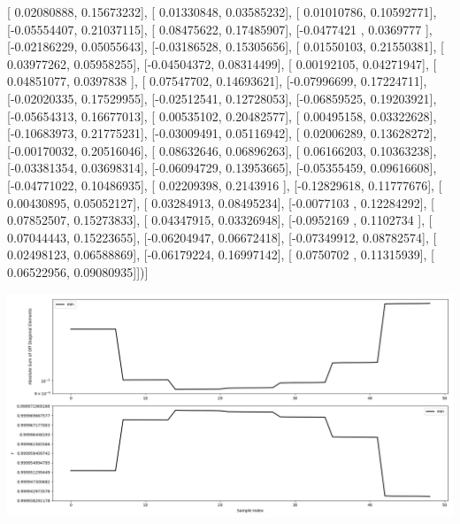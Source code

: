 \documentclass{article}
\begin{document}
       [ 0.02080888,  0.15673232],
       [ 0.01330848,  0.03585232],
       [ 0.01010786,  0.10592771],
       [-0.05554407,  0.21037115],
       [ 0.08475622,  0.17485907],
       [-0.0477421 ,  0.0369777 ],
       [-0.02186229,  0.05055643],
       [-0.03186528,  0.15305656],
       [ 0.01550103,  0.21550381],
       [ 0.03977262,  0.05958255],
       [-0.04504372,  0.08314499],
       [ 0.00192105,  0.04271947],
       [ 0.04851077,  0.0397838 ],
       [ 0.07547702,  0.14693621],
       [-0.07996699,  0.17224711],
       [-0.02020335,  0.17529955],
       [-0.02512541,  0.12728053],
       [-0.06859525,  0.19203921],
       [-0.05654313,  0.16677013],
       [ 0.00535102,  0.20482577],
       [ 0.00495158,  0.03322628],
       [-0.10683973,  0.21775231],
       [-0.03009491,  0.05116942],
       [ 0.02006289,  0.13628272],
       [-0.00170032,  0.20516046],
       [ 0.08632646,  0.06896263],
       [ 0.06166203,  0.10363238],
       [-0.03381354,  0.03698314],
       [-0.06094729,  0.13953665],
       [-0.05355459,  0.09616608],
       [-0.04771022,  0.10486935],
       [ 0.02209398,  0.2143916 ],
       [-0.12829618,  0.11777676],
       [ 0.00430895,  0.05052127],
       [ 0.03284913,  0.08495234],
       [-0.0077103 ,  0.12284292],
       [ 0.07852507,  0.15273833],
       [ 0.04347915,  0.03326948],
       [-0.0952169 ,  0.1102734 ],
       [ 0.07044443,  0.15223655],
       [-0.06204947,  0.06672418],
       [-0.07349912,  0.08782574],
       [ 0.02498123,  0.06588869],
       [-0.06179224,  0.16997142],
       [ 0.0750702 ,  0.11315939],
       [ 0.06522956,  0.09080935]])]
\begin{center}
\includegraphics[scale=.9]{report_pickled_controls130/control_dpn_all.png}

\end{center}
\end{document}

